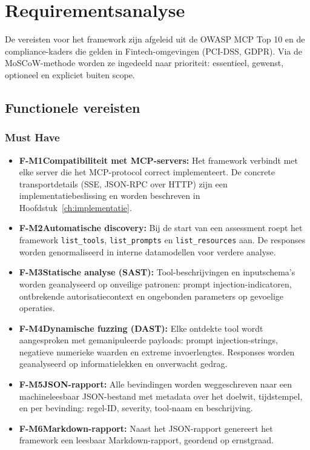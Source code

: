 
\chapter{Requirementsanalyse}%
\label{ch:requirements}

De vereisten voor het framework zijn afgeleid uit de OWASP MCP Top 10 en de compliance-kaders die gelden in Fintech-omgevingen (PCI-DSS, GDPR). Via de MoSCoW-\allowbreak methode worden ze ingedeeld naar prioriteit: essentieel, gewenst, optioneel en expliciet buiten scope.

\section{Functionele vereisten}

\subsection*{Must Have}

\begin{itemize}
    \item \textbf{F-M1Compatibiliteit met MCP-servers:} Het framework verbindt met elke server die het MCP-protocol correct implementeert. De concrete transportdetails (SSE, JSON-RPC over HTTP) zijn een implementatiebeslissing en worden beschreven in Hoofdstuk~\ref{ch:implementatie}.
    \item \textbf{F-M2Automatische discovery:} Bij de start van een assessment roept het framework \texttt{list\_tools}, \texttt{list\_prompts} en \texttt{list\_resources} aan. De responses worden genormaliseerd in interne datamodellen voor verdere analyse.
    \item \textbf{F-M3Statische analyse (SAST):} Tool-beschrijvingen en inputschema's worden geanalyseerd op onveilige patronen: prompt injection-indicatoren, ontbrekende autorisatiecontext en ongebonden parameters op gevoelige operaties.
    \item \textbf{F-M4Dynamische fuzzing (DAST):} Elke ontdekte tool wordt aangesproken met gemanipuleerde payloads: prompt injection-strings, negatieve numerieke waarden en extreme invoerlengtes. Responses worden geanalyseerd op informatielekken en onverwacht gedrag.
    \item \textbf{F-M5JSON-rapport:} Alle bevindingen worden weggeschreven naar een machineleesbaar JSON-bestand met metadata over het doelwit, tijdstempel, en per bevinding: regel-ID, severity, tool-naam en beschrijving.
    \item \textbf{F-M6Markdown-rapport:} Naast het JSON-rapport genereert het framework een leesbaar Markdown-rapport, geordend op ernstgraad.
\end{itemize}


